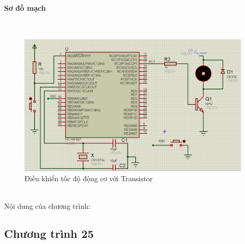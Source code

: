 \paragraph{Sơ đồ mạch}{~\\}
\begin{figure}[!h]
\begin{center}
\includegraphics[scale=.5]{bai-8/image/BAI-8-2-2}
\end{center}
\caption{Điều khiển tốc độ động cơ với Transistor}
\end{figure}\\

Nội dung của chương trình: 
\subsection*{Chương trình 25}

